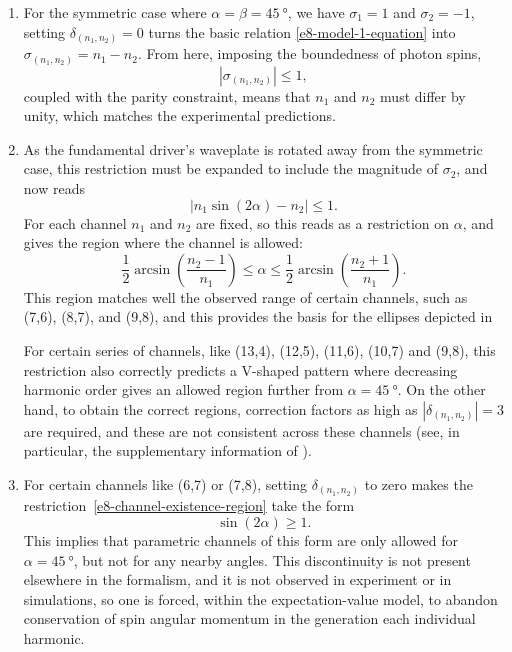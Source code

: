 \begin{enumerate}[label=(\roman*)]

 \item
 For the symmetric case where $\alpha=\beta=\SI{45}{\degree}$, we have $\sigma_1=1$ and $\sigma_2=-1$, setting \mbox{$\delta_{(n_1,n_2)}=0$} turns the basic relation \eqref{e8-model-1-equation} into $\sigma_{(n_1,n_2)}=n_1-n_2$. From here, imposing the boundedness of photon spins, 
 \begin{equation}
 |\sigma_{(n_1,n_2)}|\leq 1,
 \label{e8-photon-spin-boundedness}
 \end{equation} coupled with the parity constraint, means that $n_1$ and $n_2$ must differ by unity, which matches the experimental predictions.
 
 \item
 As the fundamental driver's waveplate is rotated away from the symmetric case, this restriction must be expanded to include the magnitude of $\sigma_2$, and now reads
 \begin{equation}
 |n_1\sin(2\alpha) - n_2| \leq 1.
 \label{e8-channel-existence-region}
 \end{equation}
 For each channel $n_1$ and $n_2$ are fixed, so this reads as a restriction on $\alpha$, and gives the region where the channel is allowed:
 \begin{equation}
 \frac12\arcsin\left(\frac{n_2-1}{n_1}\right)\leq\alpha\leq\frac12\arcsin\left(\frac{n_2+1}{n_1}\right).
 \label{e8-channel-existence-region-unbundled}
 \end{equation}
 This region matches well the observed range of certain channels, such as (7,6), (8,7), and (9,8), and this provides the basis for the ellipses depicted in 
 
 For certain series of channels, like (13,4), (12,5), (11,6), (10,7) and (9,8), this restriction also correctly predicts a V-shaped pattern where decreasing harmonic order gives an allowed region further from $\alpha=\SI{45}{\degree}$. On the other hand, to obtain the correct regions, correction factors as high as $|\delta_{(n_1,n_2)}|=3$ are required, and these are not consistent across these channels (see, in particular, the supplementary information of ).
 
 \item \label{e8-disallowed-channels-discontinuity}
 For certain channels like (6,7) or (7,8), setting $\delta_{(n_1,n_2)}$ to zero makes the restriction~\eqref{e8-channel-existence-region} take the form
 \begin{equation}
 \sin(2\alpha) \geq 1.
 \label{e8-channel-existence-discontinuity}
 \end{equation}
 This implies that parametric channels of this form are only allowed for $\alpha = \SI{45}{\degree}$, but not for any nearby angles. This discontinuity is not present elsewhere in the formalism, and it is not observed in experiment or in simulations, so one is forced, within the expectation-value model, to abandon conservation of spin angular momentum in the generation each individual harmonic.
 

\end{enumerate}
